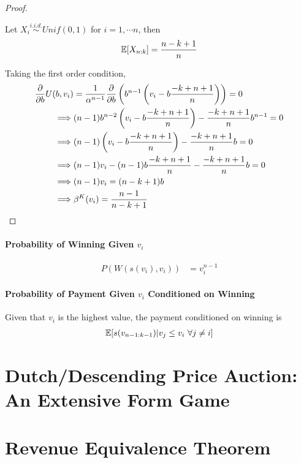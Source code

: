 \documentclass{article}
\begin{document}
\begin{proof}
		\begin{proposition}
			Let $X_i \overset{i.i.d.}{\sim} Unif(0, 1)$ for $i = 1, \cdots n$, then
			\begin{align}
				\mathbb{E}[{X_{n:k}}] = \frac{n-k+1}{n}
			\end{align}
		\end{proposition}
		
		Taking the first order condition,
		\begin{align}
			\frac{\partial{}}{\partial{b}} U(b, v_i) &= \frac{1}{\alpha^{n-1}}
			\frac{\partial{}}{\partial{b}} \left(
			b^{n-1} \left(
			v_i - b \frac{-k+n+1}{n}
			\right)
			\right) = 0 \\
			\implies
			&(n-1)b^{n-2}
			\left(
			v_i - b \frac{-k+n+1}{n}
			\right)
			- \frac{-k+n+1}{n} b^{n-1} = 0 \\
			\implies
			&(n-1)
			\left(
			v_i - b \frac{-k+n+1}{n}
			\right)
			- \frac{-k+n+1}{n} b = 0 \\
			\implies
			&(n-1)
			v_i - (n-1) b \frac{-k+n+1}{n}
			- \frac{-k+n+1}{n} b = 0 \\
			\implies &(n-1)v_i = (n-k+1)b \\
			\implies &\beta^K(v_i) = \frac{n-1}{n-k+1}
		\end{align}
	\end{proof}
	
	\paragraph{Probability of Winning Given $v_i$}
	\begin{align}
		P(W(s(v_i), v_i)) &= v_i^{n-1}
	\end{align}
	
	\paragraph{Probability of Payment Given $v_i$ Conditioned on Winning} Given that $v_i$ is the highest value, the payment conditioned on winning is
	\begin{align}
		\mathbb{E}[{s(v_{n-1:k-1})|v_j \leq v_i\ \forall j \neq i}]
	\end{align}
	
	\section{Dutch/Descending Price Auction: An Extensive Form Game}
	
	\section{Revenue Equivalence Theorem}
	
\end{document}
